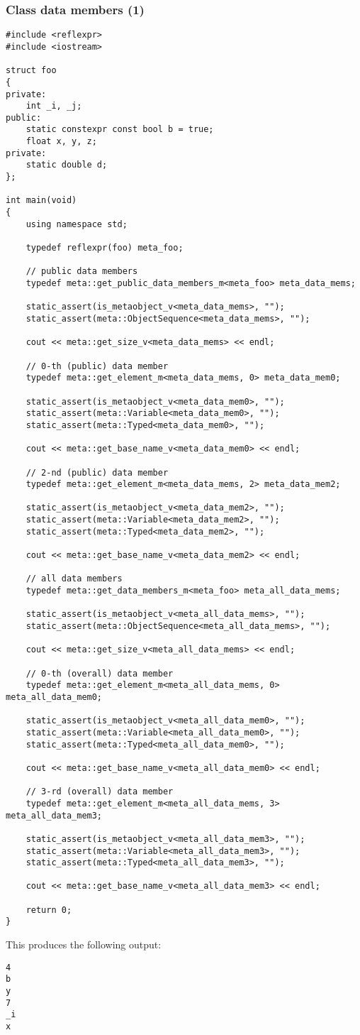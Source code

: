 \subsubsection{Class data members (1)}

\begin{verbatim}
#include <reflexpr>
#include <iostream>

struct foo
{
private:
	int _i, _j;
public:
	static constexpr const bool b = true;
	float x, y, z;
private:
	static double d;
};

int main(void)
{
	using namespace std;

	typedef reflexpr(foo) meta_foo;

	// public data members
	typedef meta::get_public_data_members_m<meta_foo> meta_data_mems;

	static_assert(is_metaobject_v<meta_data_mems>, "");
	static_assert(meta::ObjectSequence<meta_data_mems>, "");

	cout << meta::get_size_v<meta_data_mems> << endl;

	// 0-th (public) data member
	typedef meta::get_element_m<meta_data_mems, 0> meta_data_mem0;

	static_assert(is_metaobject_v<meta_data_mem0>, "");
	static_assert(meta::Variable<meta_data_mem0>, "");
	static_assert(meta::Typed<meta_data_mem0>, "");

	cout << meta::get_base_name_v<meta_data_mem0> << endl;

	// 2-nd (public) data member
	typedef meta::get_element_m<meta_data_mems, 2> meta_data_mem2;

	static_assert(is_metaobject_v<meta_data_mem2>, "");
	static_assert(meta::Variable<meta_data_mem2>, "");
	static_assert(meta::Typed<meta_data_mem2>, "");

	cout << meta::get_base_name_v<meta_data_mem2> << endl;

	// all data members
	typedef meta::get_data_members_m<meta_foo> meta_all_data_mems;

	static_assert(is_metaobject_v<meta_all_data_mems>, "");
	static_assert(meta::ObjectSequence<meta_all_data_mems>, "");

	cout << meta::get_size_v<meta_all_data_mems> << endl;

	// 0-th (overall) data member
	typedef meta::get_element_m<meta_all_data_mems, 0> meta_all_data_mem0;

	static_assert(is_metaobject_v<meta_all_data_mem0>, "");
	static_assert(meta::Variable<meta_all_data_mem0>, "");
	static_assert(meta::Typed<meta_all_data_mem0>, "");

	cout << meta::get_base_name_v<meta_all_data_mem0> << endl;

	// 3-rd (overall) data member
	typedef meta::get_element_m<meta_all_data_mems, 3> meta_all_data_mem3;

	static_assert(is_metaobject_v<meta_all_data_mem3>, "");
	static_assert(meta::Variable<meta_all_data_mem3>, "");
	static_assert(meta::Typed<meta_all_data_mem3>, "");

	cout << meta::get_base_name_v<meta_all_data_mem3> << endl;

	return 0;
}

\end{verbatim}

This produces the following output:

\begin{verbatim}
4
b
y
7
_i
x
\end{verbatim}
